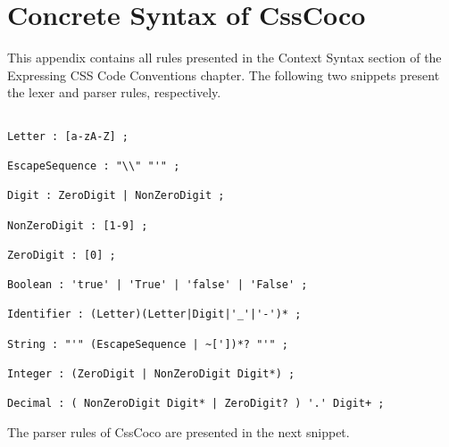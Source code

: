 \chapter{Concrete Syntax of CssCoco}

This appendix contains all rules presented in the Context Syntax section of the Expressing CSS Code Conventions chapter. The following two snippets present the lexer and parser rules, respectively.

\begin{snippet}
\begin{verbatim}

Letter : [a-zA-Z] ;

EscapeSequence : "\\" "'" ;

Digit : ZeroDigit | NonZeroDigit ;

NonZeroDigit : [1-9] ;

ZeroDigit : [0] ;

Boolean : 'true' | 'True' | 'false' | 'False' ;

Identifier : (Letter)(Letter|Digit|'_'|'-')* ;

String : "'" (EscapeSequence | ~['])*? "'" ;

Integer : (ZeroDigit | NonZeroDigit Digit*) ;

Decimal : ( NonZeroDigit Digit* | ZeroDigit? ) '.' Digit+ ;

\end{verbatim}
\end{snippet}

The parser rules of CssCoco are presented in the next snippet.

